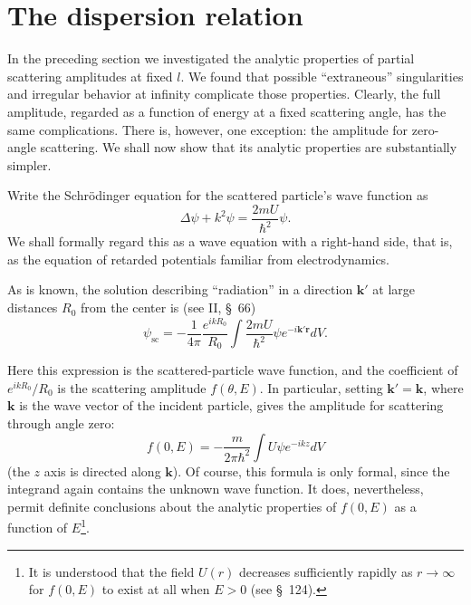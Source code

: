 \section{The dispersion relation}

In the preceding section we investigated the analytic properties of partial
scattering amplitudes at fixed $l$. We found that possible ``extraneous''
singularities and irregular behavior at infinity complicate those properties.
Clearly, the full amplitude, regarded as a function of energy at a fixed
scattering angle, has the same complications. There is, however, one
exception: the amplitude for zero-angle scattering. We shall now show that its
analytic properties are substantially simpler.

Write the Schrödinger equation for the scattered particle's wave function as
\begin{equation}
 \Delta\psi+k^2\psi=\frac{2mU}{\hbar^2}\psi.
 \tag{129.1}
\end{equation}
We shall formally regard this as a wave equation with a right-hand side, that
is, as the equation of retarded potentials familiar from electrodynamics.

As is known, the solution describing ``radiation'' in a direction $\mathbf k'$
at large distances $R_0$ from the center is (see II, \S~66)
\begin{equation}
 \psi_{\text{sc}}=-\frac1{4\pi}\frac{e^{ikR_0}}{R_0}
 \int\frac{2mU}{\hbar^2}\psi e^{-i\mathbf k'\mathbf r}dV.
 \tag{129.2}
\end{equation}

Here this expression is the scattered-particle wave function, and the
coefficient of $e^{ikR_0}/R_0$ is the scattering amplitude $f(\theta,E)$. In
particular, setting $\mathbf k'=\mathbf k$, where $\mathbf k$ is the wave
vector of the incident particle, gives the amplitude for scattering through
angle zero:
\begin{equation}
 f(0,E)=-\frac{m}{2\pi\hbar^2}\int U\psi e^{-ikz}dV
 \tag{129.3}
\end{equation}
(the $z$ axis is directed along $\mathbf k$). Of course, this formula is only
formal, since the integrand again contains the unknown wave function. It does,
nevertheless, permit definite conclusions about the analytic properties of
$f(0,E)$ as a function of $E$\footnote{It is understood that the field $U(r)$
decreases sufficiently rapidly as $r\to\infty$ for $f(0,E)$ to exist at all
when $E>0$ (see \S~124).}.

